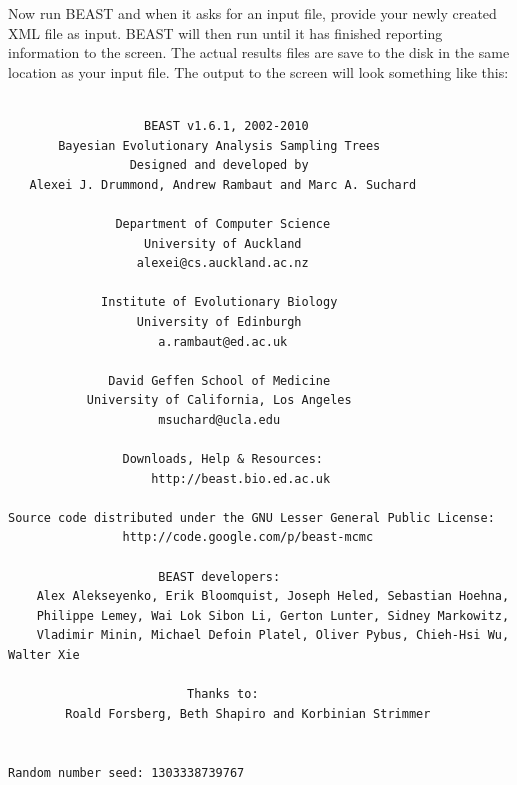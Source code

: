 \documentclass[12pt]{article}
\begin{document}
\medskip{}

Now run BEAST and when it asks for an input file, provide your newly
created XML file as input. BEAST will then run until it has finished
reporting information to the screen. The actual results files are
save to the disk in the same location as your input file. The output to the screen will
look something like this: 

{\scriptsize   
\begin{verbatim}

                   BEAST v1.6.1, 2002-2010
       Bayesian Evolutionary Analysis Sampling Trees
                 Designed and developed by
   Alexei J. Drummond, Andrew Rambaut and Marc A. Suchard
                              
               Department of Computer Science
                   University of Auckland
                  alexei@cs.auckland.ac.nz
                              
             Institute of Evolutionary Biology
                  University of Edinburgh
                     a.rambaut@ed.ac.uk
                              
              David Geffen School of Medicine
           University of California, Los Angeles
                     msuchard@ucla.edu
                              
                Downloads, Help & Resources:
                 	http://beast.bio.ed.ac.uk
                              
Source code distributed under the GNU Lesser General Public License:
            	http://code.google.com/p/beast-mcmc
                              
                     BEAST developers:
	Alex Alekseyenko, Erik Bloomquist, Joseph Heled, Sebastian Hoehna, 
	Philippe Lemey, Wai Lok Sibon Li, Gerton Lunter, Sidney Markowitz, 
	Vladimir Minin, Michael Defoin Platel, Oliver Pybus, Chieh-Hsi Wu, Walter Xie
                              
                         Thanks to:
    	Roald Forsberg, Beth Shapiro and Korbinian Strimmer


Random number seed: 1303338739767


\end{verbatim}}
\end{document}
